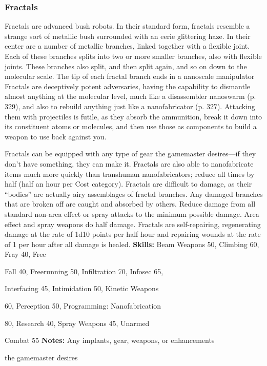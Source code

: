 \subsubsection{Fractals }

Fractals are advanced bush robots. In their standard 
form, fractals resemble a strange sort of metallic 
bush surrounded with an eerie glittering haze. In 
their center are a number of metallic branches, linked 
together with a flexible joint. Each of these branches 
splits into two or more smaller branches, also with 
flexible joints. These branches also split, and then split 
again, and so on down to the molecular scale. The tip 
of each fractal branch ends in a nanoscale manipulator
Fractals are deceptively potent adversaries, having
the capability to dismantle almost anything at the 
molecular level, much like a disassembler nanoswarm 
(p. 329), and also to rebuild anything just like a nanofabricator
(p. 327). Attacking them with projectiles is
futile, as they absorb the ammunition, break it down 
into its constituent atoms or molecules, and then use 
those as components to build a weapon to use back 
against you.

Fractals can be equipped with any type of gear the 
gamemaster desires—if they don't have something, 
they can make it. Fractals are also able to nanofabricate
items much more quickly than transhuman
nanofabricators; reduce all times by half (half an hour 
per Cost category). Fractals are difficult to damage, as 
their ``bodies'' are actually airy assemblages of fractal 
branches. Any damaged branches that are broken off 
are caught and absorbed by others. Reduce damage 
from all standard non-area effect or spray attacks to 
the minimum possible damage. Area effect and spray 
weapons do half damage. Fractals are self-repairing, 
regenerating damage at the rate of 1d10 points per 
half hour and repairing wounds at the rate of 1 per 
hour after all damage is healed.
\textbf{Skills:} Beam Weapons 50, Climbing 60, Fray 40, Free 

Fall 40, Freerunning 50, Infiltration 70, Infosec 65, 

Interfacing 45, Intimidation 50, Kinetic Weapons 

60, Perception 50, Programming: Nanofabrication 

80, Research 40, Spray Weapons 45, Unarmed 

Combat 55
\textbf{Notes:} Any implants, gear, weapons, or enhancements 

the gamemaster desires

